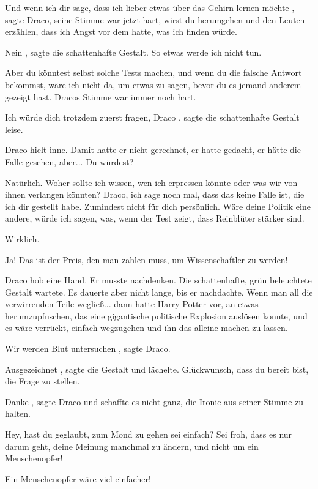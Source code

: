 \glqq Und wenn ich dir sage, dass ich lieber etwas über das Gehirn lernen
möchte\grqq{} , sagte Draco, seine Stimme war jetzt hart, \glqq wirst du
herumgehen und den Leuten erzählen, dass ich Angst vor dem hatte, was ich finden
würde.\grqq{}

\glqq Nein\grqq{} , sagte die schattenhafte Gestalt. \glqq So etwas werde ich
nicht tun.\grqq{}

\glqq Aber du könntest selbst solche Tests machen, und wenn du die falsche
Antwort bekommst, wäre ich nicht da, um etwas zu sagen, bevor du es jemand
anderem gezeigt hast.\grqq{} Dracos Stimme war immer noch hart.

\glqq Ich würde dich trotzdem zuerst fragen, Draco\grqq{} , sagte die
schattenhafte Gestalt leise.

Draco hielt inne. Damit hatte er nicht gerechnet, er hatte gedacht, er hätte die
Falle gesehen, aber... \glqq Du würdest?\grqq{}

\glqq Natürlich. Woher sollte ich wissen, wen ich erpressen könnte oder was wir
von ihnen verlangen könnten? Draco, ich sage noch mal, dass das keine Falle ist,
die ich dir gestellt habe. Zumindest nicht für dich persönlich. Wäre deine
Politik eine andere, würde ich sagen, was, wenn der Test zeigt, dass Reinblüter
stärker sind.\grqq{}

\glqq Wirklich.\grqq{}

\glqq Ja! Das ist der Preis, den man zahlen muss, um Wissenschaftler zu
werden!\grqq{}

Draco hob eine Hand. Er musste nachdenken. Die schattenhafte, grün beleuchtete
Gestalt wartete. Es dauerte aber nicht lange, bis er nachdachte. Wenn man all
die verwirrenden Teile wegließ... dann hatte Harry Potter vor, an etwas
herumzupfuschen, das eine gigantische politische Explosion auslösen konnte, und
es wäre verrückt, einfach wegzugehen und ihn das alleine machen zu lassen.

\glqq Wir werden Blut untersuchen\grqq{} , sagte Draco.

\glqq Ausgezeichnet\grqq{} , sagte die Gestalt und lächelte. \glqq Glückwunsch,
dass du bereit bist, die Frage zu stellen.\grqq{}

\glqq Danke\grqq{} , sagte Draco und schaffte es nicht ganz, die Ironie aus
seiner Stimme zu halten.

\glqq Hey, hast du geglaubt, zum Mond zu gehen sei einfach? Sei froh, dass es
nur darum geht, deine Meinung manchmal zu ändern, und nicht um ein
Menschenopfer!\grqq{}

\glqq Ein Menschenopfer wäre viel einfacher!\grqq{}

